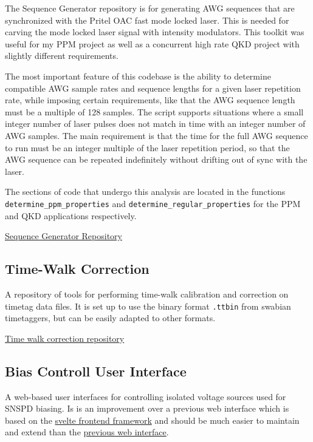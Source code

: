 \documentclass[11pt]{caltech_thesis} %
\begin{document}
The Sequence Generator repository is for generating AWG sequences that are synchronized with the Pritel OAC fast mode locked laser. This is needed for carving the mode locked laser signal with intensity modulators. This toolkit was useful for my PPM project as well as a concurrent high rate QKD project with slightly different requirements.

The most important feature of this codebase is the ability to determine compatible AWG sample rates and sequence lengths for a given laser repetition rate, while imposing certain requirements, like that the AWG sequence length must be a multiple of 128 samples. The script supports situations where a small integer number of laser pulses does not match in time with an integer number of AWG samples. The main requirement is that the time for the full AWG sequence to run must be an integer multiple of the laser repetition period, so that the AWG sequence can be repeated indefinitely without drifting out of sync with the laser.

The sections of code that undergo this analysis are located in the functions \texttt{determine\_ppm\_properties} and \texttt{determine\_regular\_properties} for the PPM and QKD applications respectively.

\href{https://github.com/sansseriff/sequence_generator/tree/main}{Sequence Generator Repository}

\hypertarget{time-walk-correction-1}{%
\subsection{Time-Walk Correction}\label{time-walk-correction-1}}

A repository of tools for performing time-walk calibration and correction on timetag data files. It is set up to use the binary format \texttt{.ttbin} from swabian timetaggers, but can be easily adapted to other formats.

\href{https://github.com/sansseriff/SNSPD-time-walk-and-jitter-correction}{Time walk correction repository}

\hypertarget{bias-controll-user-interface}{%
\subsection{Bias Controll User Interface}\label{bias-controll-user-interface}}

A web-based user interfaces for controlling isolated voltage sources used for SNSPD biasing. Is is an improvement over a previous web interface which is based on the \href{https://svelte.dev/}{svelte frontend framework} and should be much easier to maintain and extend than the \href{https://github.com/sansseriff/Isolated_Vsource}{previous web interface}.
\end{document}
